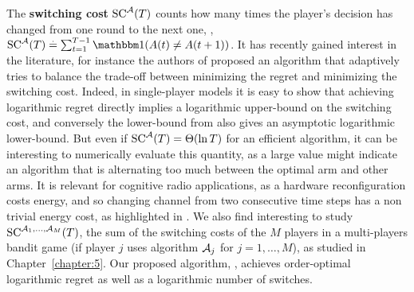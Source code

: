 
The \textbf{switching cost} $\mathrm{SC}^{\mathcal{A}}(T)$ counts how many times the player's decision has changed from one round to the next one, \ie, $\mathrm{SC}^{\cA}(T) \eqdef \sum_{t=1}^{T-1} \indic(A(t) \neq A(t+1))$.
It has recently gained interest in the literature, for instance the authors of \cite{Koren17} proposed an algorithm that adaptively tries to balance the trade-off between minimizing the regret and minimizing the switching cost.
%
Indeed, in single-player models it is easy to show that achieving logarithmic regret directly implies a logarithmic upper-bound on the switching cost, and conversely the lower-bound from \cite{LaiRobbins85} also gives an asymptotic logarithmic lower-bound.
But even if $\mathrm{SC}^{\mathcal{A}}(T) = \Theta(\ln T)$ for an efficient algorithm, it can be interesting to numerically evaluate this quantity, as a large value might indicate an algorithm that is alternating too much between the optimal arm and other arms.
%
It is relevant for cognitive radio applications, as a hardware reconfiguration costs energy, and so changing channel from two consecutive time steps has a non trivial energy cost, as highlighted in \cite{modiDemo2016}.
We also find interesting to study $\mathrm{SC}^{\mathcal{A}_1,\dots,\mathcal{A}_M}(T)$, the sum of the switching costs of the $M$ players in a multi-players bandit game (if player $j$ uses algorithm $\mathcal{A}_j$ for $j=1,\dots,M$), as studied in Chapter~\ref{chapter:5}.
Our proposed algorithm, \MCTopM, achieves order-optimal logarithmic regret as well as a logarithmic number of switches.
